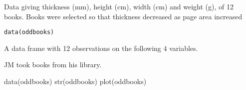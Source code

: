 \begin{Description}\relax
Data giving thickness (mm), height (cm), width (cm)
and weight (g), of 12 books.  Books were selected so that thickness
decreased as page area increased
\end{Description}
\begin{Usage}
\begin{verbatim}data(oddbooks)\end{verbatim}
\end{Usage}
\begin{Format}\relax
A data frame with 12 observations on the following 4 variables.
\end{Format}
\begin{Details}\relax
\end{Details}
\begin{Source}\relax
JM took books from his library.
\end{Source}
\begin{Examples}
\begin{ExampleCode}
data(oddbooks)
str(oddbooks)
plot(oddbooks) 
\end{ExampleCode}
\end{Examples}

